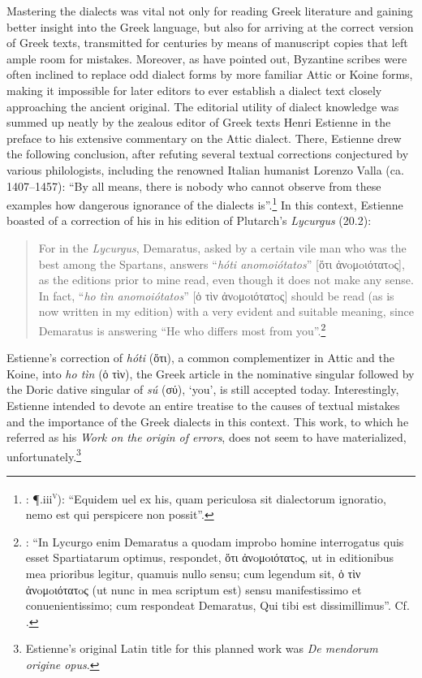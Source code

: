 Mastering the dialects was vital not only for reading Greek literature and gaining better insight into the Greek language, but also for arriving at the correct version of Greek texts, transmitted for centuries by means of manuscript copies that left ample room for mistakes. Moreover, as \citet[47--48]{Reynolds1991} have pointed out, Byzantine scribes were often inclined to replace odd dialect forms by more familiar Attic or Koine forms, making it impossible for later editors to ever establish a dialect text closely approaching the ancient original. The editorial utility of dialect knowledge was summed up neatly by the zealous editor of Greek texts Henri Estienne in the preface to his extensive commentary on the Attic dialect. There, Estienne drew the following conclusion, after refuting several textual corrections conjectured by various philologists, including the renowned Italian humanist Lorenzo Valla (ca. 1407–1457): “By all means, there is nobody who cannot observe from these examples how dangerous ignorance of the dialects is”.\footnote{\citet{Estienne1573}: ¶.iii\textsc{\textsuperscript{v}}): “Equidem uel ex his, quam periculosa sit dialectorum ignoratio, nemo est qui perspicere non possit”.} In this context, Estienne boasted of a correction of his in his edition of Plutarch’s \textit{Lycurgus} (20.2):

\begin{quote}
For in the \textit{Lycurgus}, Demaratus, asked by a certain vile man who was the best among the Spartans, answers “\textit{hóti anomoiótatos}” [ὅτι ἀνoμoιότατoς], as the editions prior to mine read, even though it does not make any sense. In fact, “\textit{ho tìn anomoiótatos}” [ὁ τὶν ἀνoμoιότατoς] should be read (as is now written in my edition) with a very evident and suitable meaning, since Demaratus is answering “He who differs most from you”.\footnote{\citet[¶.iii\textsc{\textsuperscript{v}}]{Estienne1573}: “In Lycurgo enim Demaratus a quodam improbo homine interrogatus quis esset Spartiatarum optimus, respondet, ὅτι ἀνoμoιότατoς, ut in editionibus mea prioribus legitur, quamuis nullo sensu; cum legendum sit, ὁ τὶν ἀνoμoιότατoς (ut nunc in mea scriptum est) sensu manifestissimo et conuenientissimo; cum respondeat Demaratus, Qui tibi est dissimillimus”. Cf. \citet[36, 43–44]{Estienne1581}.}
\end{quote}

Estienne’s correction of \textit{hóti} (ὅτι), a common complementizer in Attic and the Koine, into \textit{ho tìn} (ὁ τὶν), the Greek article in the nominative singular followed by the Doric dative singular of \textit{sú} (σύ), ‘you’, is still accepted today. Interestingly, Estienne intended to devote an entire treatise to the causes of textual mistakes and the importance of the Greek dialects in this context. This work, to which he referred as his \textit{Work on the origin of errors}, does not seem to have materialized, unfortunately.\footnote{Estienne’s original Latin title for this planned work was \textit{De mendorum origine opus}.}

